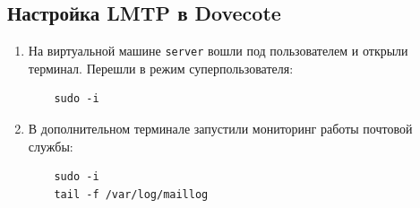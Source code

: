 \subsection{Настройка LMTP в Dovecote}
\begin{enumerate}
\item На виртуальной машине \texttt{server} вошли под пользователем и открыли терминал. Перешли в режим суперпользователя:
  \begin{verbatim}
    sudo -i
  \end{verbatim}
\item В дополнительном терминале запустили мониторинг работы почтовой службы:
  \begin{verbatim}
    sudo -i
    tail -f /var/log/maillog
  \end{verbatim}


\end{enumerate}
